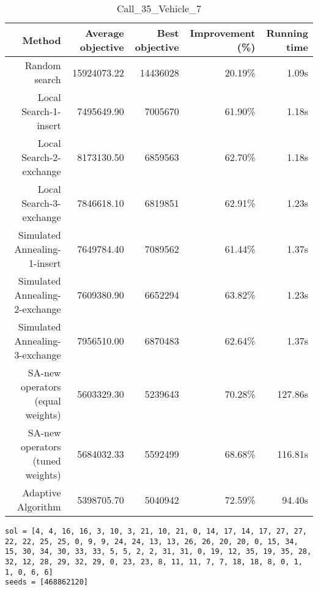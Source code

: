 \begin{table}[ht]
\centering
\caption{Call\_35\_Vehicle\_7}
\label{tab:call35vehicle7}
\begin{tabular}{|r|r|r|r|r|}
Method & Average objective & Best objective & Improvement (\%) & Running time \\
\hline
Random search & 15924073.22 & 14436028 & 20.19\% & 1.09s\\
Local Search-1-insert & 7495649.90 & 7005670 & 61.90\% & 1.18s\\
Local Search-2-exchange & 8173130.50 & 6859563 & 62.70\% & 1.18s\\
Local Search-3-exchange & 7846618.10 & 6819851 & 62.91\% & 1.23s\\
Simulated Annealing-1-insert & 7649784.40 & 7089562 & 61.44\% & 1.37s\\
Simulated Annealing-2-exchange & 7609380.90 & 6652294 & 63.82\% & 1.23s\\
Simulated Annealing-3-exchange & 7956510.00 & 6870483 & 62.64\% & 1.37s\\
SA-new operators (equal weights) & 5603329.30 & 5239643 & 70.28\% & 127.86s\\
SA-new operators (tuned weights) & 5684032.33 & 5592499 & 68.68\% & 116.81s\\
Adaptive Algorithm & 5398705.70 & 5040942 & 72.59\% & 94.40s\\
\end{tabular}%
\end{table}
\begin{lstlisting}[label={lst:call35vehicle7},caption=Optimal solution call\_35\_vehicle\_7]
sol = [4, 4, 16, 16, 3, 10, 3, 21, 10, 21, 0, 14, 17, 14, 17, 27, 27, 22, 22, 25, 25, 0, 9, 9, 24, 24, 13, 13, 26, 26, 20, 20, 0, 15, 34, 15, 30, 34, 30, 33, 33, 5, 5, 2, 2, 31, 31, 0, 19, 12, 35, 19, 35, 28, 32, 12, 28, 29, 32, 29, 0, 23, 23, 8, 11, 11, 7, 7, 18, 18, 8, 0, 1, 1, 0, 6, 6]
seeds = [468862120]
\end{lstlisting}%
\clearpage


